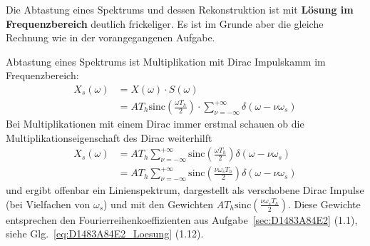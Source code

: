 \begin{Loesung}
\begin{center}
\end{center}
%
%
%

Die Abtastung eines Spektrums und dessen Rekonstruktion ist mit
\textbf{Lösung im Frequenzbereich} deutlich frickeliger.
Es ist im Grunde aber die gleiche Rechnung wie in der vorangegangenen Aufgabe.

Abtastung eines Spektrums ist Multiplikation mit Dirac Impulskamm im Frequenzbereich:
\begin{align}
X_s(\omega)
&= X(\omega) \cdot S(\omega)\\
&= A T_h\mathrm{sinc}(\frac{\omega T_h}{2}) \cdot \sum_{\nu=-\infty}^{+\infty} \delta(\omega-\nu \omega_s)
\end{align}
Bei Multiplikationen mit einem Dirac immer erstmal schauen ob die Multiplikationseigenschaft des Dirac weiterhilft
\begin{align}
X_s(\omega)
&= A T_h \sum_{\nu=-\infty}^{+\infty} \mathrm{sinc}(\frac{\omega T_h}{2}) \delta(\omega-\nu \omega_s)\\
&= A T_h \sum_{\nu=-\infty}^{+\infty} \mathrm{sinc}(\frac{\nu \omega_s T_h}{2}) \delta(\omega-\nu \omega_s)
\end{align}
und ergibt offenbar ein Linienspektrum, dargestellt als verschobene Dirac Impulse (bei Vielfachen von $\omega_s$)
und mit den Gewichten $A T_h \mathrm{sinc}(\frac{\nu \omega_s T_h}{2})$. Diese Gewichte
entsprechen den Fourierreihenkoeffizienten aus Aufgabe~\ref{sec:D1483A84E2} (1.1), siehe Glg.~\eqref{eq:D1483A84E2_Loesung} (1.12).


\end{Loesung}
